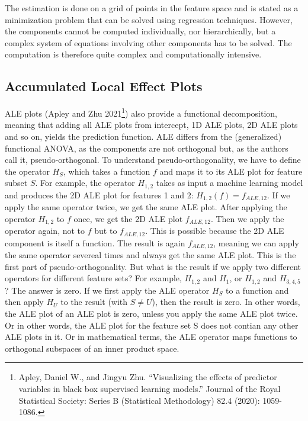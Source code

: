 \documentclass[
  12pt,
]{krantz}
\begin{document}
The estimation is done on a grid of points in the feature space and is stated as a minimization problem that can be solved using regression techniques.
However, the components cannot be computed individually, nor hierarchically, but a complex system of equations involving other components has to be solved.
The computation is therefore quite complex and computationally intensive.

\hypertarget{accumulated-local-effect-plots}{%
\subsection{Accumulated Local Effect Plots}\label{accumulated-local-effect-plots}}

ALE plots (Apley and Zhu 2021\footnote{Apley, Daniel W., and Jingyu Zhu. ``Visualizing the effects of predictor variables in black box supervised learning models.'' Journal of the Royal Statistical Society: Series B (Statistical Methodology) 82.4 (2020): 1059-1086.}) also provide a functional decomposition, meaning that adding all ALE plots from intercept, 1D ALE plots, 2D ALE plots and so on, yields the prediction function.
ALE differs from the (generalized) functional ANOVA, as the components are not orthogonal but, as the authors call it, pseudo-orthogonal.
To understand pseudo-orthogonality, we have to define the operator \(H_S\), which takes a function \(f\) and maps it to its ALE plot for feature subset \(S\).
For example, the operator \(H_{1,2}\) takes as input a machine learning model and produces the 2D ALE plot for features 1 and 2: \(H_{1,2}(f) = f_{ALE,12}\).
If we apply the same operator twice, we get the same ALE plot.
After applying the operator \(H_{1,2}\) to \(f\) once, we get the 2D ALE plot \(f_{ALE,12}\).
Then we apply the operator again, not to \(f\) but to \(f_{ALE,12}\).
This is possible because the 2D ALE component is itself a function.
The result is again \(f_{ALE,12}\), meaning we can apply the same operator severeal times and always get the same ALE plot.
This is the first part of pseudo-orthogonality.
But what is the result if we apply two different operators for different feature sets?
For example, \(H_{1,2}\) and \(H_{1}\), or \(H_{1,2}\) and \(H_{3,4,5}\)?
The answer is zero.
If we first apply the ALE operator \(H_S\) to a function and then apply \(H_U\) to the result (with \(S \neq U\)), then the result is zero.
In other words, the ALE plot of an ALE plot is zero, unless you apply the same ALE plot twice.
Or in other words, the ALE plot for the feature set S does not contian any other ALE plots in it.
Or in mathematical terms, the ALE operator maps functions to orthogonal subspaces of an inner product space.
\end{document}
